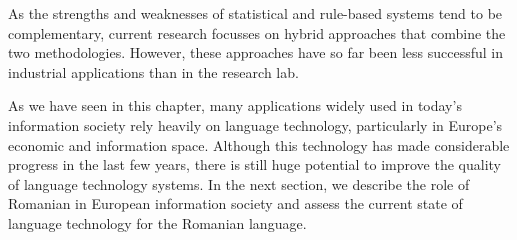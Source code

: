\documentclass[]{../../metanetpaper}
\begin{document}
\begin{multicols}{2}

As the strengths and weaknesses of statistical and rule-based systems tend to be complementary, current research focusses on hybrid approaches that combine the two methodologies. However, these approaches have so far been less successful in industrial applications than in the research lab. 

As we have seen in this chapter, many applications widely used in today’s information society rely heavily on language technology, particularly in Europe’s economic and information space. Although this technology has made considerable progress in the last few years, there is still huge potential to improve the quality of language technology systems. In the next section, we describe the role of Romanian in European information society and assess the current state of language technology for the Romanian language.
\end{multicols}

\clearpage

\end{document}
